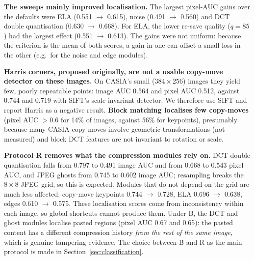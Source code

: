 \textbf{The sweeps mainly improved localisation.} The largest pixel-AUC gains over the defaults were ELA
(0.551 $\rightarrow$ 0.615), noise (0.491 $\rightarrow$ 0.560) and DCT double quantisation (0.630 $\rightarrow$
0.668). For ELA, the lower re-save quality ($q=85$) had the largest effect (0.551 $\rightarrow$ 0.613). The gains
were not uniform: because the criterion is the mean of both scores, a gain in one can offset a small loss in the
other (e.g.\ for the noise and edge modules).

\textbf{Harris corners, proposed originally, are not a usable copy-move detector on these images.} On CASIA's small
($384\times256$) images they yield few, poorly repeatable points: image AUC 0.564 and pixel AUC 0.512, against 0.744
and 0.719 with SIFT's scale-invariant detector. We therefore use SIFT and report Harris as a negative result.
\textbf{Block matching localises few copy-moves} (pixel AUC $>0.6$ for 14\% of images, against 56\% for
keypoints), presumably because many CASIA copy-moves involve geometric transformations (not measured) and block DCT
features are not invariant to rotation or scale.

\textbf{Protocol R removes what the compression modules rely on.} DCT double quantisation falls from 0.797 to 0.491
image AUC and from 0.668 to 0.543 pixel AUC, and JPEG ghosts from 0.745 to 0.602 image AUC; resampling breaks the
$8\times8$ JPEG grid, so this is expected. Modules that do not depend on the grid are much less affected: copy-move
keypoints 0.744 $\rightarrow$ 0.728, ELA 0.696 $\rightarrow$ 0.638, edges 0.610 $\rightarrow$ 0.575. These
localisation scores come from inconsistency within each image, so global shortcuts cannot produce them. Under B,
the DCT and ghost modules localise pasted regions (pixel AUC 0.67 and 0.65): the pasted content has a different
compression history \emph{from the rest of the same image}, which is genuine tampering evidence. The choice between
B and R as the main protocol is made in Section~\ref{sec:classification}.
